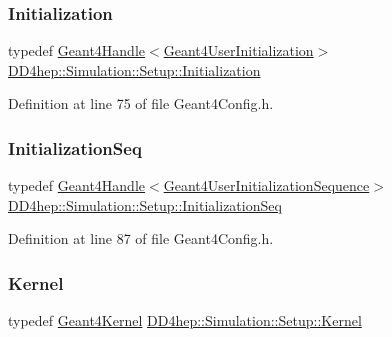 \subsubsection{\texorpdfstring{Initialization}{Initialization}}
{\footnotesize\ttfamily typedef \hyperlink{class_d_d4hep_1_1_simulation_1_1_geant4_handle}{Geant4\+Handle}$<$\hyperlink{class_d_d4hep_1_1_simulation_1_1_geant4_user_initialization}{Geant4\+User\+Initialization}$>$ \hyperlink{namespace_d_d4hep_1_1_simulation_1_1_setup_ad0eadfa9fa826619419b5350ce1bafae}{D\+D4hep\+::\+Simulation\+::\+Setup\+::\+Initialization}}



Definition at line 75 of file Geant4\+Config.\+h.

\hypertarget{namespace_d_d4hep_1_1_simulation_1_1_setup_a37cbef7433b99bf178ae539e3696477d}{}\label{namespace_d_d4hep_1_1_simulation_1_1_setup_a37cbef7433b99bf178ae539e3696477d} 
\subsubsection{\texorpdfstring{Initialization\+Seq}{InitializationSeq}}
{\footnotesize\ttfamily typedef \hyperlink{class_d_d4hep_1_1_simulation_1_1_geant4_handle}{Geant4\+Handle}$<$\hyperlink{class_d_d4hep_1_1_simulation_1_1_geant4_user_initialization_sequence}{Geant4\+User\+Initialization\+Sequence}$>$ \hyperlink{namespace_d_d4hep_1_1_simulation_1_1_setup_a37cbef7433b99bf178ae539e3696477d}{D\+D4hep\+::\+Simulation\+::\+Setup\+::\+Initialization\+Seq}}



Definition at line 87 of file Geant4\+Config.\+h.

\hypertarget{namespace_d_d4hep_1_1_simulation_1_1_setup_a463a13fee8e841935ffc1c013755240e}{}\label{namespace_d_d4hep_1_1_simulation_1_1_setup_a463a13fee8e841935ffc1c013755240e} 
\subsubsection{\texorpdfstring{Kernel}{Kernel}}
{\footnotesize\ttfamily typedef \hyperlink{class_d_d4hep_1_1_simulation_1_1_geant4_kernel}{Geant4\+Kernel} \hyperlink{namespace_d_d4hep_1_1_simulation_1_1_setup_a463a13fee8e841935ffc1c013755240e}{D\+D4hep\+::\+Simulation\+::\+Setup\+::\+Kernel}}



